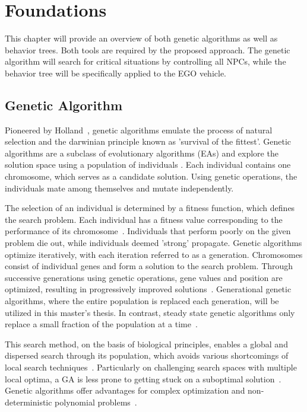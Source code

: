 \chapter{Foundations}
\label{chap:foundations}
This chapter will provide an overview of both genetic algorithms as well as behavior trees. Both tools are required by the proposed approach. The genetic algorithm will search for critical situations by controlling all NPCs, while the behavior tree will be specifically applied to the EGO vehicle.

\section{Genetic Algorithm}
\label{sect:foundations:genetic_algorithm}
Pioneered by Holland~\cite{holland_adaptation_1992}, genetic algorithms emulate the process of natural selection and the darwinian principle known as 'survival of the fittest'. Genetic algorithms are a subclass of evolutionary algorithms (EAs) and explore the solution space using a population of individuals \cite{mills_determining_2015}. Each individual contains one chromosome, which serves as a candidate solution. Using genetic operations, the individuals mate among themselves and mutate independently. 

The selection of an individual is determined by a fitness function, which defines the search problem. Each individual has a fitness value corresponding to the performance of its chromosome~\cite{majumdar_genetic_2015}. Individuals that perform poorly on the given problem die out, while individuals deemed 'strong' propagate. Genetic algorithms optimize iteratively, with each iteration referred to as a generation. Chromosomes consist of individual genes and form a solution to the search problem. Through successive generations using genetic operations, gene values and position are optimized, resulting in progressively improved solutions~\cite{srinivas_genetic_1994}. Generational genetic algorithms, where the entire population is replaced each generation, will be utilized in this master's thesis. In contrast, steady state genetic algorithms only replace a small fraction of the population at a time~\cite{srinivas_genetic_1994}.

This search method, on the basis of biological principles, enables a global and dispersed search through its population, which avoids various shortcomings of local search techniques~\cite{grefenstette_optimization_1986}. Particularly on challenging search spaces with multiple local optima, a GA is less prone to getting stuck on a suboptimal solution~\cite{katoch_review_2021, xia_genetic_2019, majumdar_genetic_2015}. Genetic algorithms offer advantages for complex optimization and non-deterministic polynomial problems~\cite{hussain_trade-off_2020}.

